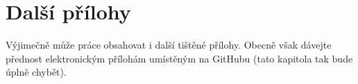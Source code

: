 \chapter{Další přílohy}

Výjimečně může práce obsahovat i další tištěné přílohy. Obecně však dávejte přednost elektronickým přílohám umístěným na GitHubu (tato kapitola tak bude úplně chybět). 
